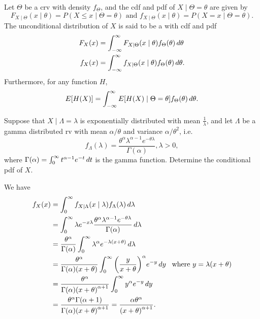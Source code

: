 \documentclass[notoc,notitlepage]{tufte-book}
\begin{document}
\begin{defn}\label{defn:continuous_mixture}
  Let $\Theta$ be a crv with density $f_\Theta$, and the cdf and pdf of $X \mid \Theta = \theta$ are given by
  \begin{equation*}
    F_{X \mid \Theta}(x \mid \theta) = P(X \leq x \mid \Theta = \theta) \text{ and } f_{X \mid \Theta}(x \mid \theta) = P(X = x \mid \Theta = \theta).
  \end{equation*}
  The unconditional distribution of $X$ is said to be a  with cdf and pdf
  \begin{align*}
    F_X(x) &= \int_{-\infty}^{\infty} F_{X \mid \Theta}(x\mid\theta) f_{\Theta}(\theta) \mathop{}\!d{\theta} \\
    f_X(x) &= \int_{-\infty}^{\infty} f_{X \mid \Theta}(x\mid\theta) f_{\Theta}(\theta) \mathop{}\!d{\theta}.
  \end{align*}
  Furthermore, for any function $H$,
  \begin{equation*}
    E[H(X)] = \int_{-\infty}^{\infty} E[H(X) \mid \Theta = \theta] f_{\Theta}(\theta) \mathop{}\!d{\theta}.
  \end{equation*}
\end{defn}

\begin{eg}
  Suppose that $X \mid \Lambda = \lambda$ is exponentially distributed with mean $\frac{1}{\lambda}$, and let $\Lambda$ be a gamma distributed rv with mean $\alpha / \theta$ and variance $\alpha / \theta^2$, i.e.
  \begin{equation*}
    f_{\Lambda}(\lambda) = \frac{\theta^\alpha \lambda^{\alpha - 1} e^{-\theta \lambda}}{\Gamma(\alpha)}, \lambda > 0,
  \end{equation*}
  where $\Gamma(\alpha) = \int_{0}^{\infty} t^{\alpha - 1} e^{-t} \mathop{}\!d{t}$ is the gamma function. Determine the conditional pdf of $X$.
\end{eg}

\begin{solution}
  We have
  \begin{align*}
    f_X(x) &= \int_{0}^{\infty} f_{X \mid \Lambda}(x \mid \lambda) f_{\Lambda}(\lambda) \mathop{}\!d{\lambda} \\
           &= \int_{0}^{\infty} \lambda e^{-x \lambda} \frac{\theta^{\alpha} \lambda^{\alpha - 1} e^{-\theta \lambda}}{\Gamma(\alpha)} \mathop{}\!d{\lambda} \\
           &= \frac{\theta^\alpha}{\Gamma(\alpha)} \int_{0}^{\infty} \lambda^\alpha e^{-\lambda ( x + \theta )} \mathop{}\!d{\lambda} \\
           &= \frac{\theta^\alpha}{\Gamma(\alpha) (x + \theta)} \int_{0}^{\infty} {\left( \frac{y}{x + \theta} \right)}^\alpha e^{-y} \mathop{}\!d{y} \enspace \text{ where } y = \lambda ( x + \theta ) \\
           &= \frac{\theta^\alpha}{\Gamma(\alpha) {( x + \theta )}^{\alpha + 1}} \int_{0}^{\infty} y^\alpha e^{-y} \mathop{}\!d{y} \\
           &= \frac{\theta^\alpha \Gamma(\alpha + 1)}{\Gamma(\alpha) {( x + \theta )}^{\alpha + 1}} = \frac{\alpha \theta^\alpha}{{(x + \theta)}^{\alpha + 1}}.
  \end{align*}
\end{solution}
\end{document}
